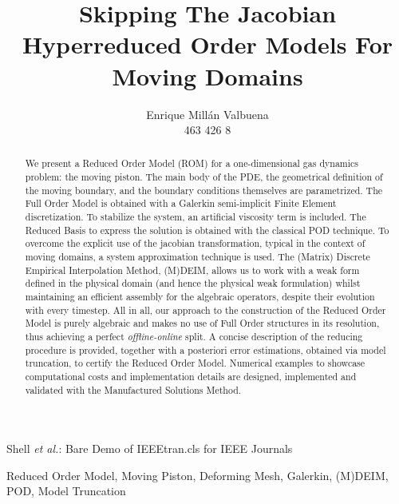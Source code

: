 \documentclass[a4paper, technote, compsoc, draft]{IEEEtran}
\begin{document}
\onecolumn

\title{Skipping The Jacobian \\[5mm] \large{Hyperreduced Order Models For Moving Domains}}

\author{Enrique Millán Valbuena \\ \normalsize{463 426 8}}%
        
{Shell \MakeLowercase{\textit{et al.}}: Bare Demo of IEEEtran.cls for IEEE Journals}

\maketitle

\begin{abstract}
   We present a Reduced Order Model (ROM) for a one-dimensional gas dynamics problem:
   the moving piston.
   The main body of the PDE, 
   the geometrical definition of the moving boundary, 
   and the boundary conditions themselves are parametrized.
   The Full Order Model is obtained with a Galerkin semi-implicit Finite Element discretization.
   To stabilize the system, an artificial viscosity term is included.
   The Reduced Basis to express the solution is obtained with the classical POD technique.
   To overcome the explicit use of the jacobian transformation, 
   typical in the context of moving domains,
   a system approximation technique is used.
   The (Matrix) Discrete Empirical Interpolation Method, (M)DEIM, allows us
   to work with a weak form defined in the physical domain (and hence the physical weak formulation)
   whilst maintaining an
   efficient assembly for the algebraic operators, 
   despite their evolution with every timestep.
   All in all, our approach to the construction of the Reduced Order Model is purely algebraic
   and makes no use of Full Order structures in its resolution, 
   thus achieving a perfect \textit{offline-online} split.
   A concise description of the reducing procedure is provided, 
   together with a posteriori error estimations, obtained via model truncation,
   to certify the Reduced Order Model.
   Numerical examples to showcase computational costs and implementation details are designed, 
   implemented and validated with the Manufactured Solutions Method.
\end{abstract}

\begin{IEEEkeywords}
    Reduced Order Model, 
    Moving Piston, Deforming Mesh, 
    Galerkin, (M)DEIM, POD, 
    Model Truncation
\end{IEEEkeywords}
\end{document}
